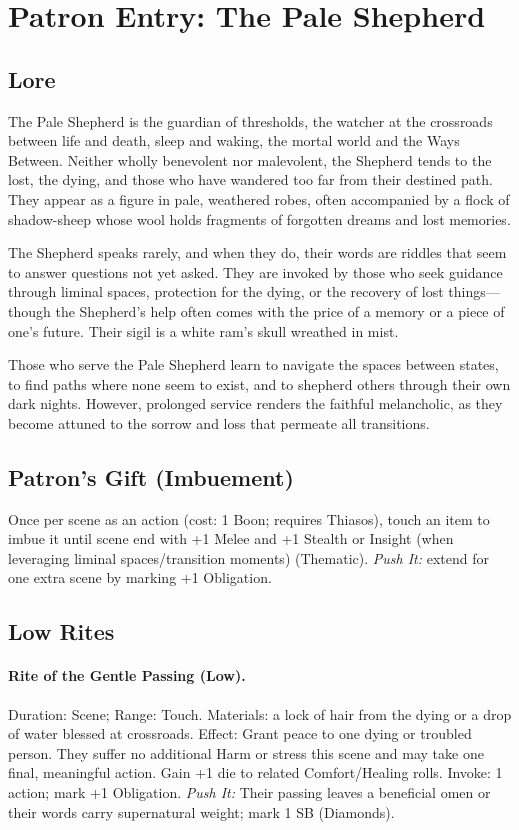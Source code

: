 \section{Patron Entry: The Pale Shepherd}
\label{patron:pale-shepherd}

\subsection*{Lore}
The Pale Shepherd is the guardian of thresholds, the watcher at the crossroads between life and death, sleep and waking, the mortal world and the Ways Between. Neither wholly benevolent nor malevolent, the Shepherd tends to the lost, the dying, and those who have wandered too far from their destined path. They appear as a figure in pale, weathered robes, often accompanied by a flock of shadow-sheep whose wool holds fragments of forgotten dreams and lost memories.  

The Shepherd speaks rarely, and when they do, their words are riddles that seem to answer questions not yet asked. They are invoked by those who seek guidance through liminal spaces, protection for the dying, or the recovery of lost things---though the Shepherd's help often comes with the price of a memory or a piece of one's future. Their sigil is a white ram's skull wreathed in mist.  

Those who serve the Pale Shepherd learn to navigate the spaces between states, to find paths where none seem to exist, and to shepherd others through their own dark nights. However, prolonged service renders the faithful melancholic, as they become attuned to the sorrow and loss that permeate all transitions.

\subsection*{Patron's Gift (Imbuement)}
Once per scene as an action (cost: 1 Boon; requires Thiasos), touch an item to imbue it until scene end with +1 Melee and +1 Stealth or Insight (when leveraging liminal spaces/transition moments) (Thematic). \emph{Push It:} extend for one extra scene by marking +1 Obligation.

\subsection*{Low Rites}
\paragraph{Rite of the Gentle Passing (Low).} Duration: Scene; Range: Touch.  
Materials: a lock of hair from the dying or a drop of water blessed at crossroads.  
Effect: Grant peace to one dying or troubled person. They suffer no additional Harm or stress this scene and may take one final, meaningful action. Gain +1 die to related Comfort/Healing rolls.  
Invoke: 1 action; mark +1 Obligation.  
\emph{Push It:} Their passing leaves a beneficial omen or their words carry supernatural weight; mark 1 SB (Diamonds).  

